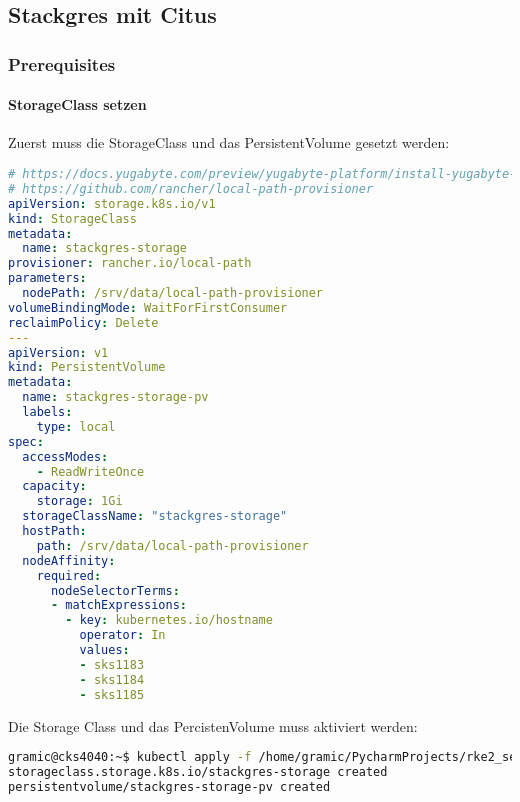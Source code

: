 
\subsection{Stackgres mit Citus}
\label{subsec:evaluation_installation_stackgres}
\subsubsection{Prerequisites}
\paragraph{StorageClass setzen}
Zuerst muss die StorageClass und das PersistentVolume gesetzt werden:
\lstset{style=gra_codestyle}
\begin{lstlisting}[language=yaml, caption=StackGres-Citus - StorageClass setzen,captionpos=b,label={lst:stackgres-citus-storageclass-yaml},breaklines=true]
# https://docs.yugabyte.com/preview/yugabyte-platform/install-yugabyte-platform/prepare-environment/kubernetes/#configure-storage-class
# https://github.com/rancher/local-path-provisioner
apiVersion: storage.k8s.io/v1
kind: StorageClass
metadata:
  name: stackgres-storage
provisioner: rancher.io/local-path
parameters:
  nodePath: /srv/data/local-path-provisioner
volumeBindingMode: WaitForFirstConsumer
reclaimPolicy: Delete
---
apiVersion: v1
kind: PersistentVolume
metadata:
  name: stackgres-storage-pv
  labels:
    type: local
spec:
  accessModes:
    - ReadWriteOnce
  capacity:
    storage: 1Gi
  storageClassName: "stackgres-storage"
  hostPath:
    path: /srv/data/local-path-provisioner
  nodeAffinity:
    required:
      nodeSelectorTerms:
      - matchExpressions:
        - key: kubernetes.io/hostname
          operator: In
          values:
          - sks1183
          - sks1184
          - sks1185
\end{lstlisting}

Die Storage Class und das PercistenVolume muss aktiviert werden:
\lstset{style=gra_codestyle}
\begin{lstlisting}[language=bash, caption=StackGres-Citus - StorageClass / PersistentVolume aktivieren,captionpos=b,label={lst:stackgres_citus-storageclass-apply},breaklines=true]
gramic@cks4040:~$ kubectl apply -f /home/gramic/PycharmProjects/rke2_settings/stackgres_citus/stackgres_citus/storageclass.yaml
storageclass.storage.k8s.io/stackgres-storage created
persistentvolume/stackgres-storage-pv created
\end{lstlisting}
